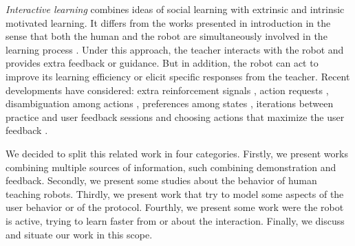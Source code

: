 
\emph{Interactive learning} combines ideas of social learning with extrinsic and intrinsic motivated learning. It differs from the works presented in introduction in the sense that both the human and the robot are simultaneously involved in the learning process \cite{kaplan2002robotic,nicolescu2003natural,breazeal2004tutelage,thomaz2008teachable}. Under this approach, the teacher interacts with the robot and provides extra feedback or guidance. But in addition, the robot can act to improve its learning efficiency or elicit specific responses from the teacher. Recent developments have considered: extra reinforcement signals \cite{thomaz2008teachable}, action requests \cite{macl09airl}, disambiguation among actions \cite{chernova09jair}, preferences among states \cite{Mason2011}, iterations between practice and user feedback sessions \cite{judah2010reinforcement} and choosing actions that maximize the user feedback \cite{knox2009interactively}.

We decided to split this related work in four categories. Firstly, we present works combining multiple sources of information, such combining demonstration and feedback. Secondly, we present some studies about the behavior of human teaching robots. Thirdly, we present work that try to model some aspects of the user behavior or of the protocol. Fourthly, we present some work were the robot is active, trying to learn faster from or about the interaction. Finally, we discuss and situate our work in this scope.


